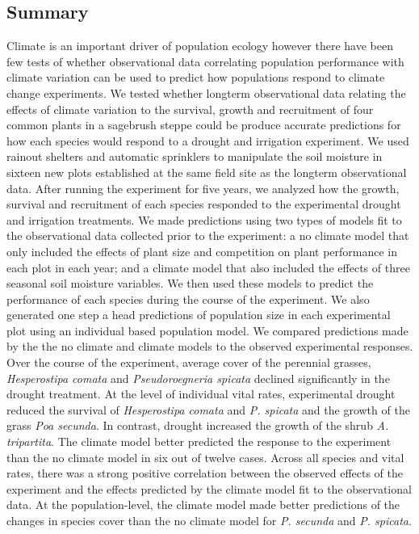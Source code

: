 \documentclass[11pt]{article}
\begin{document}
\begin{doublespacing} 

\linenumbers

\section*{Summary}


Climate is an important driver of population ecology however there have been few tests of whether observational data correlating population performance with climate variation can be used to predict how populations respond to climate change experiments. We tested whether longterm observational data relating the effects of climate variation to the survival, growth and recruitment of four common plants in a sagebrush steppe could be produce accurate predictions for how each species would respond to a drought and irrigation experiment. 
We used rainout shelters and automatic sprinklers to manipulate the soil moisture in sixteen new plots established at the same field site as the longterm observational data. After running the experiment for five years, we analyzed how the growth, survival and recruitment of each species responded to the experimental drought and irrigation treatments. We made predictions using two types of models fit to the observational data collected prior to the experiment: a no climate model that only included the effects of plant size and competition on plant performance in each plot in each year; and a climate model that also included the effects of three seasonal soil moisture variables. We then used these models to predict the performance of each species during the course of the experiment. We also generated one step a head predictions of population size in each experimental plot using an individual based population model. We compared predictions made by the the no climate and climate models to the observed experimental responses. 
Over the course of the experiment, average cover of the perennial grasses, \textit{Hesperostipa comata} and \textit{Pseudoroegneria spicata} declined significantly in the drought treatment. At the level of individual vital rates, experimental drought reduced the survival of \textit{Hesperostipa comata} and \textit{P. spicata}  and the growth of the grass \textit{Poa secunda}. In contrast, drought increased the growth of the shrub \textit{A. tripartita}. The climate model better predicted the response to the experiment than the no climate model in six out of twelve cases. Across all species and vital rates, there was a strong positive correlation between the observed effects of the experiment and the effects predicted by the climate model fit to the observational data. At the population-level, the climate model made better predictions of the changes in species cover than the no climate model for \textit{P. secunda} and \textit{P. spicata}. 

\end{doublespacing}
\end{document}
